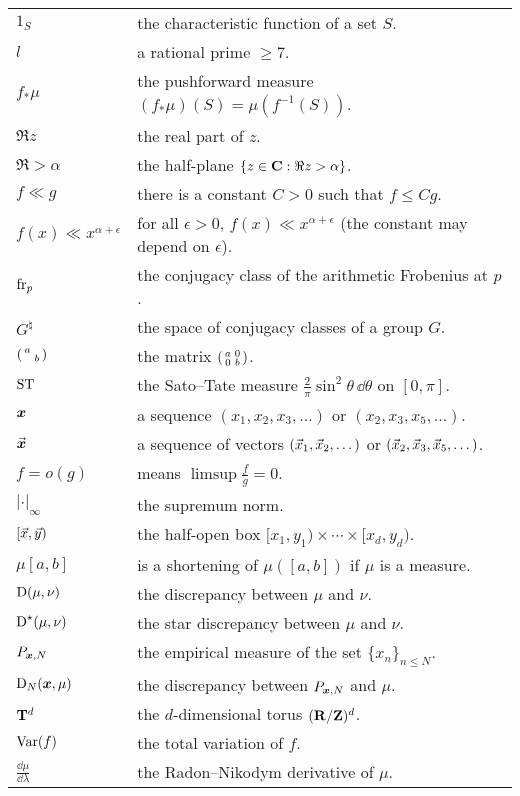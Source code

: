 \documentclass[phd,cornellheadings,tocprelim]{cornell}
\begin{document}
\begin{tabular}{ll}
$1_S$     
	& the characteristic function of a set $S$. \\
$l$       
	& a rational prime $\geqslant 7$. \\
$f_\ast\mu$
	& the pushforward measure $(f_\ast\mu)(S) = \mu(f^{-1}(S))$. \\
$\Re z$
	& the real part of $z$. \\
$\Re > \alpha$
	& the half-plane $\{z\in \mathbf{C} : \Re z > \alpha\}$. \\
$f \ll g$ 
	& there is a constant $C>0$ such that $f \leqslant C g$. \\
$f(x) \ll x^{\alpha+\epsilon}$ 
	& for all $\epsilon>0$, $f(x) \ll x^{\alpha+\epsilon}$ (the constant may depend on $\epsilon$). \\
$\mathrm{fr}_p$
	& the conjugacy class of the arithmetic Frobenius at $p$. \\
$G^\natural$
	& the space of conjugacy classes of a group $G$. \\
$\left(\begin{smallmatrix} a &  \\  & b \end{smallmatrix}\right)$
	& the matrix $\left(\begin{smallmatrix} a & 0 \\ 0 & b \end{smallmatrix}\right)$. \\
$\mathrm{ST}$
	& the Sato--Tate measure $\frac{2}{\pi} \sin^2\theta\, \dd\theta$ on $[0,\pi]$. \\
${\boldsymbol x}$
	& a sequence $(x_1,x_2,x_3,\dots)$ or $(x_2,x_3,x_5,\dots)$. \\
$\vec{\boldsymbol x}$
	& a sequence of vectors $(\vec{x}_1,\vec{x}_2,\dots)$ or $(\vec{x}_2,\vec{x}_3,\vec{x}_5,\dots)$. \\
$f = o(g)$
	& means $\limsup \frac f g = 0$. \\
$|\cdot|_\infty$
	& the supremum norm. \\
$[\vec{x},\vec{y})$
	& the half-open box $[x_1,y_1) \times \cdots \times [x_d,y_d)$. \\
$\mu[a,b]$
	& is a shortening of $\mu([a,b])$ if $\mu$ is a measure. \\
$\operatorname{D}(\mu,\nu)$
	& the discrepancy between $\mu$ and $\nu$. \\
$\operatorname{D}^\star(\mu,\nu)$
	& the star discrepancy between $\mu$ and $\nu$. \\
$P_{{\boldsymbol x},N}$
	& the empirical measure of the set $\{x_n\}_{n\leqslant N}$. \\
$\operatorname{D}_N({\boldsymbol x},\mu)$
	& the discrepancy between $P_{{\boldsymbol x},N}$ and $\mu$. \\
$\mathbf{T}^d$
	& the $d$-dimensional torus $(\mathbf{R}/\mathbf{Z})^d$. \\
$\operatorname{Var}(f)$
	& the total variation of $f$. \\
$\frac{\dd\mu}{\dd\lambda}$
	& the Radon--Nikodym derivative of $\mu$. \\

\end{tabular}
\end{document}
